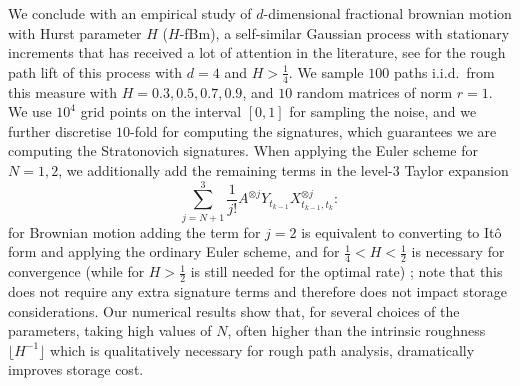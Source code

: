 \documentclass{article}
\numberwithin{equation}{section}
\theoremstyle{definition}
\theoremstyle{remark}
\begin{document}
We conclude with an empirical study of $d$-dimensional fractional brownian motion with Hurst parameter $H$ ($H$-fBm), a self-similar Gaussian process with stationary increments that has received a lot of attention in the literature, see \cite{CQ02} for the rough path lift of this process with $d = 4$ and $H > \frac 14$. We sample $100$ paths i.i.d.\ from this measure with $H = 0.3, 0.5, 0.7, 0.9$, and $10$ random matrices of norm $r = 1$. We use $10^4$ grid points on the interval $[0,1]$ for sampling the noise, and we further discretise $10$-fold for computing the signatures, which guarantees we are computing the Stratonovich signatures. When applying the Euler scheme for $N = 1,2$, we additionally add the remaining terms in the level-$3$ Taylor expansion
\[
\sum_{j = N+1}^3 \frac{1}{j!}A^{\otimes j}Y_{t_{k-1}}X_{t_{k-1},t_k}^{\otimes j}:
\]
for Brownian motion adding the term for $j = 2$ is equivalent to converting to It\^o form and applying the ordinary Euler scheme, and for $\frac 14 < H < \frac 12$ is necessary for convergence (while for $H > \frac 12$ is still needed for the optimal rate) \cite{BFRS16, HLN16}; note that this does not require any extra signature terms and therefore does not impact storage considerations. Our numerical results show that, for several  choices of the parameters, taking high values of $N$, often higher than the intrinsic roughness $\lfloor H^{-1} \rfloor$ which is qualitatively necessary for rough path analysis, dramatically improves storage cost.
\end{document}
